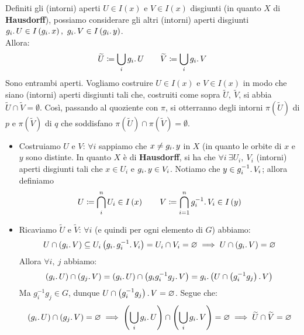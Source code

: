 \begin{demonstration}
\begin{enumerate}[label=\Roman*]
Definiti gli (intorni) aperti $U\in I\left(x\right)$ e $V\in I\left(x\right)$ disgiunti (in quanto $X$ di \textbf{Hausdorff}), possiamo considerare gli altri (intorni) aperti disgiunti $g_i\ldotp U\in I\left(g_i\ldotp x\right),\ g_i\ldotp V\in I\left(g_i\ldotp y\right)$.\\
Allora:
\begin{equation}
\widetilde{U}\coloneqq \union_{i}g_i\ldotp U\qquad \widetilde{V}\coloneqq \union_{i}g_i\ldotp V
\end{equation}
Sono entrambi aperti. Vogliamo costruire $U\in I\left(x\right)$ e $V\in I\left(x\right)$ in modo che siano (intorni) aperti disgiunti tali che, costruiti come sopra $\widetilde{U},\ \widetilde{V}$, si abbia $\widetilde{U}\cap \widetilde{V}=\emptyset$. Così, passando al quoziente con $\pi$, si otterranno degli intorni $\pi\left(\widetilde{U}\right)$ di $p$ e $\pi\left(\widetilde{V}\right)$ di $q$ che soddisfano $\pi\left(\widetilde{U}\right)\cap \pi\left(\widetilde{V}\right)=\emptyset$.\\
\begin{itemize}
\item Costruiamo $U$ e $V$: $\forall i$ sappiamo che $x\neq g_i\ldotp y$ in $X$ (in quanto le orbite di $x$ e $y$ sono distinte. In quanto $X$ è di \textbf{Hausdorff}, si ha che $\forall i\ \exists U_i,\ V_i$ (intorni) aperti disgiunti tali che $x\in U_i$ e $g_i\ldotp y\in V_i$. Notiamo che $y\in g_i^{-1}\ldotp V_i$; allora definiamo
\begin{equation*}
U\coloneqq \inter_{i}^{n}U_i\in I\left(x\right)\qquad V\coloneqq \inter_{i=1}^{n}g_i^{-1}\ldotp V_i\in I\left(y\right)
\end{equation*}
\item Ricaviamo $\widetilde{U}$ e $\widetilde{V}$: $\forall i$ (e quindi per ogni elemento di $G$) abbiamo:
\begin{equation*}
U\cap \left(g_i\ldotp V\right)\subseteq U_i\left(g_i\ldotp g_i^{-1}\ldotp V_i\right)=U_i\cap V_i=\emptyset\implies U\cap \left(g_i\ldotp V\right)=\emptyset
\end{equation*}
Allora $\forall i,\ j$ abbiamo:
\begin{equation*}
	\left(g_i\ldotp U\right)\cap \left(g_j\ldotp V\right)=\left(g_i\ldotp U\right)\cap \left(g_ig_i^{-1}g_j\ldotp V\right)= g_i\ldotp \left(U\cap \left(g_i^{-1}g_j\right)\ldotp V\right)
\end{equation*}
Ma $g_i^{-1}g_j \in G$, dunque $U\cap \left(g_i^{-1}g_j\right)\ldotp V=\emptyset$. Segue che:
\begin{equation*}
	\left(g_i\ldotp U\right)\cap \left(g_j\ldotp V\right)=\emptyset\implies
	\left(\union_{i}g_i\ldotp U\right)\cap \left(\union_{i}g_i\ldotp V\right)=\emptyset\implies \widetilde{U}\cap \widetilde{V}=\emptyset
\end{equation*}	
\end{itemize}
\end{enumerate}
\vspace{-6mm}
\end{demonstration}
